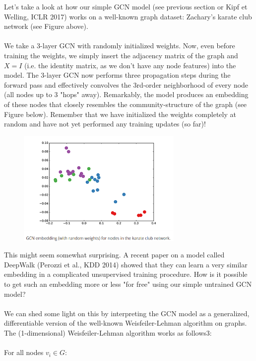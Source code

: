 \documentclass[12pt,a4paper]{article}
\begin{document}
Let's take a look at how our simple GCN model (see previous section or Kipf et Welling, ICLR 2017) works on a well-known graph dataset: Zachary's karate club network (see Figure above).
\\ \\
We take a 3-layer GCN with randomly initialized weights. Now, even before training the weights, we simply insert the adjacency matrix of the graph and $X=I$ (i.e. the identity matrix, as we don't have any node features) into the model. The 3-layer GCN now performs three propagation steps during the forward pass and effectively convolves the 3rd-order neighborhood of every node (all nodes up to 3 "hops" away). Remarkably, the model produces an embedding of these nodes that closely resembles the community-structure of the graph (see Figure below). Remember that we have initialized the weights completely at random and have not yet performed any training updates (so far)!

\begin{figure}[h]
\includegraphics[width=8cm]{GCN-embeddings}
\centering
\end{figure}
This might seem somewhat surprising. A recent paper on a model called DeepWalk (Perozzi et al., KDD 2014) showed that they can learn a very similar embedding in a complicated unsupervised training procedure. How is it possible to get such an embedding more or less "for free" using our simple untrained GCN model?
\\ \\
We can shed some light on this by interpreting the GCN model as a generalized, differentiable version of the well-known Weisfeiler-Lehman algorithm on graphs. The (1-dimensional) Weisfeiler-Lehman algorithm works as follows3:
\\ \\
For all nodes $v_{i} \in G$:
\end{document}
